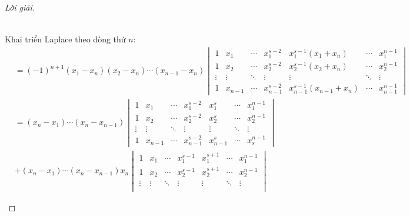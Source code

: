 \documentclass[class=linearalgebra,crop=false]{standalone}
\begin{document}
\begin{proof}[Lời giải]
\begin{enumerate}[label = (\alph*)]
\begin{align*}
              \end{align*}
              \par Khai triển Laplace theo dòng thứ $n$:
              \begin{align*}
                   & = (-1)^{n+1}(x_{1} - x_{n})(x_{2} - x_{n})\cdots (x_{n-1} - x_{n})
                  \begin{vmatrix}
                      1      & x_{1}   & \cdots & x_{1}^{s-2}   & x_{1}^{s-1}(x_{1} + x_{n})     & \cdots & x_{1}^{n-1}   \\
                      1      & x_{2}   & \cdots & x_{2}^{s-2}   & x_{2}^{s-1}(x_{2} + x_{n})     & \cdots & x_{2}^{n-1}   \\
                      \vdots & \vdots  & \ddots & \vdots        & \vdots                         & \ddots & \vdots        \\
                      1      & x_{n-1} & \cdots & x_{n-1}^{s-2} & x_{n-1}^{s-1}(x_{n-1} + x_{n}) & \cdots & x_{n-1}^{n-1}
                  \end{vmatrix}                                                    \\
                   & = (x_{n} - x_{1})\cdots (x_{n} - x_{n-1})
                  \begin{vmatrix}
                      1      & x_{1}   & \cdots & x_{1}^{s-2}   & x_{1}^{s}   & \cdots & x_{1}^{n-1} \\
                      1      & x_{2}   & \cdots & x_{2}^{s-2}   & x_{2}^{s}   & \cdots & x_{2}^{n-1} \\
                      \vdots & \vdots  & \ddots & \vdots        & \vdots      & \ddots & \vdots      \\
                      1      & x_{n-1} & \cdots & x_{n-1}^{s-2} & x_{n-1}^{s} & \cdots & x_{s}^{n-1}
                  \end{vmatrix}                                                                         \\
                   & + (x_{n} - x_{1})\cdots (x_{n} - x_{n-1})
                  x_{n}\begin{vmatrix}
                           1      & x_{1}   & \cdots & x_{1}^{s-1}   & x_{1}^{s+1}   & \cdots & x_{1}^{n-1} \\
                           1      & x_{2}   & \cdots & x_{2}^{s-1}   & x_{2}^{s+1}   & \cdots & x_{2}^{n-1} \\
                           \vdots & \vdots  & \ddots & \vdots        & \vdots        & \ddots & \vdots      \\

\end{vmatrix}
\end{align*}
\end{enumerate}
\end{proof}
\end{document}

